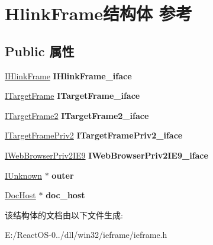\hypertarget{struct_hlink_frame}{}\section{Hlink\+Frame结构体 参考}
\label{struct_hlink_frame}
\subsection*{Public 属性}
\begin{DoxyCompactItemize}
\item 
\mbox{\label{struct_hlink_frame_aeff3b740a32dd6a1e46a2d1b37cf4f54}} 
\hyperlink{interface_i_hlink_frame}{I\+Hlink\+Frame} {\bfseries I\+Hlink\+Frame\+\_\+iface}
\item 
\mbox{\label{struct_hlink_frame_aef9c3914bf1f9fb7f245ae00fe673ce3}} 
\hyperlink{interface_i_target_frame}{I\+Target\+Frame} {\bfseries I\+Target\+Frame\+\_\+iface}
\item 
\mbox{\label{struct_hlink_frame_a6dd9c9761d8d6ee336252fcf0b47edca}} 
\hyperlink{interface_i_target_frame2}{I\+Target\+Frame2} {\bfseries I\+Target\+Frame2\+\_\+iface}
\item 
\mbox{\label{struct_hlink_frame_afeb085da06847fedfc82d5cdae204d11}} 
\hyperlink{interface_i_target_frame_priv2}{I\+Target\+Frame\+Priv2} {\bfseries I\+Target\+Frame\+Priv2\+\_\+iface}
\item 
\mbox{\label{struct_hlink_frame_ad77785042e9d5aa4872adf4e89c1e99a}} 
\hyperlink{interface_i_web_browser_priv2_i_e9}{I\+Web\+Browser\+Priv2\+I\+E9} {\bfseries I\+Web\+Browser\+Priv2\+I\+E9\+\_\+iface}
\item 
\mbox{\label{struct_hlink_frame_aa3d7048ff5d07ef789c25b9138abc8dd}} 
\hyperlink{interface_i_unknown}{I\+Unknown} $\ast$ {\bfseries outer}
\item 
\mbox{\label{struct_hlink_frame_abafe503c1755cb6de5413a84e51f45c8}} 
\hyperlink{struct_doc_host}{Doc\+Host} $\ast$ {\bfseries doc\+\_\+host}
\end{DoxyCompactItemize}


该结构体的文档由以下文件生成\+:\begin{DoxyCompactItemize}
\item 
E\+:/\+React\+O\+S-\/0../dll/win32/ieframe/ieframe.\+h\end{DoxyCompactItemize}
